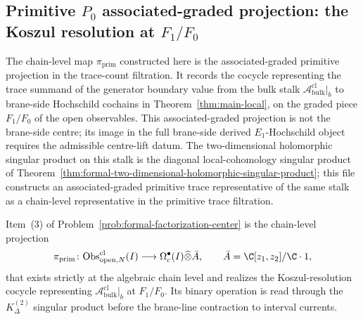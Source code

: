 \subsection{\texorpdfstring{Primitive \(P_0\) associated-graded projection: the Koszul resolution at \(F_1/F_0\)}{Primitive P0 associated-graded projection: the Koszul resolution at F1/F0}}
\label{ssec:chain-level-primitive}

The chain-level map \(\pi_{\mathrm{prim}}\) constructed here is the
associated-graded primitive projection in the trace-count filtration.
It records the cocycle representing the trace summand of the generator
boundary value from the bulk stalk
\(\mathcal A^{\mathrm{cl}}_{\mathrm{bulk}}|_b\) to brane-side
Hochschild cochains in Theorem~\ref{thm:main-local}, on the graded
piece \(F_1/F_0\) of the open observables.  This associated-graded
projection is not the brane-side centre; its image in the full
brane-side derived \(E_1\)-Hochschild object requires the admissible
centre-lift datum.
The two-dimensional
holomorphic singular product on this stalk is the diagonal
local-cohomology singular product of
Theorem~\ref{thm:formal-two-dimensional-holomorphic-singular-product}; this file
constructs an associated-graded primitive trace representative of the
same stalk as a chain-level representative in the primitive trace
filtration.

Item~(3) of
Problem~\ref{prob:formal-factorization-center} is the chain-level
projection
\[
  \pi_{\mathrm{prim}}\colon
  \mathrm{Obs}^{\mathrm{cl}}_{\mathrm{open},N}(I)
  \longrightarrow
  \Omega^\bullet_c(I)\widehat\otimes\bar A,
  \qquad
  \bar A=\C[z_1,z_2]/\C\cdot 1,
\]
that exists strictly at the algebraic chain level and realizes the
Koszul-resolution cocycle representing
\(\mathcal A^{\mathrm{cl}}_{\mathrm{bulk}}|_b\) at \(F_1/F_0\).  Its
binary operation is read through the \(K^{(2)}_\Delta\) singular
product before the
brane-line contraction to interval currents.

